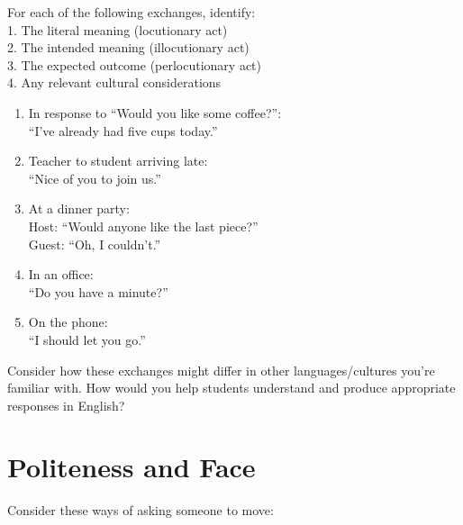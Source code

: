 \begin{tcolorbox}[title=Practice: Analyzing Speech Acts, colback=white, parbox]
\setlength{\parindent}{1.5em}
\noindent For each of the following exchanges, identify:\\
\phantom{~~~}1. The literal meaning (locutionary act)\\
\phantom{~~~}2. The intended meaning (illocutionary act)\\
\phantom{~~~}3. The expected outcome (perlocutionary act)\\
\phantom{~~~}4. Any relevant cultural considerations
\begin{enumerate}
    \item In response to ``Would you like some coffee?'':\\
    ``I've already had five cups today.''
    
    \item Teacher to student arriving late:\\
    ``Nice of you to join us.''
    
    \item At a dinner party:\\
    Host: ``Would anyone like the last piece?''\\
    Guest: ``Oh, I couldn't.''
    
    \item In an office:\\
    ``Do you have a minute?''
    
    \item On the phone:\\
    ``I should let you go.''
\end{enumerate}

Consider how these exchanges might differ in other languages/cultures you're familiar with. How would you help students understand and produce appropriate responses in English?
\end{tcolorbox}

\section{Politeness and Face}\label{sec:politeness}

Consider these ways of asking someone to move:
\ea
    \z
\z

